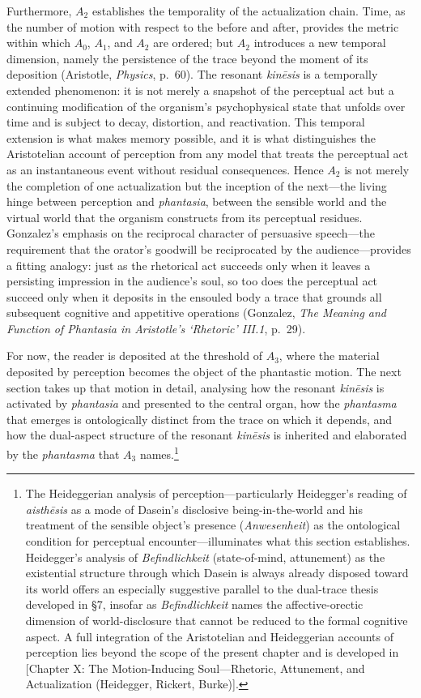 \documentclass[12pt]{article}
\begin{document}
Furthermore, $A_2$ establishes the temporality of the actualization chain. Time, as the number of motion with respect to the before and after, provides the metric within which $A_0$, $A_1$, and $A_2$ are ordered; but $A_2$ introduces a new temporal dimension, namely the persistence of the trace beyond the moment of its deposition (Aristotle, \textit{Physics}, p.~60). The resonant \textit{kinēsis} is a temporally extended phenomenon: it is not merely a snapshot of the perceptual act but a continuing modification of the organism's psychophysical state that unfolds over time and is subject to decay, distortion, and reactivation. This temporal extension is what makes memory possible, and it is what distinguishes the Aristotelian account of perception from any model that treats the perceptual act as an instantaneous event without residual consequences. Hence $A_2$ is not merely the completion of one actualization but the inception of the next---the living hinge between perception and \textit{phantasia}, between the sensible world and the virtual world that the organism constructs from its perceptual residues. Gonzalez's emphasis on the reciprocal character of persuasive speech---the requirement that the orator's goodwill be reciprocated by the audience---provides a fitting analogy: just as the rhetorical act succeeds only when it leaves a persisting impression in the audience's soul, so too does the perceptual act succeed only when it deposits in the ensouled body a trace that grounds all subsequent cognitive and appetitive operations (Gonzalez, \textit{The Meaning and Function of Phantasia in Aristotle's `Rhetoric' III.1}, p.~29).

For now, the reader is deposited at the threshold of $A_3$, where the material deposited by perception becomes the object of the phantastic motion. The next section takes up that motion in detail, analysing how the resonant \textit{kinēsis} is activated by \textit{phantasia} and presented to the central organ, how the \textit{phantasma} that emerges is ontologically distinct from the trace on which it depends, and how the dual-aspect structure of the resonant \textit{kinēsis} is inherited and elaborated by the \textit{phantasma} that $A_3$ names.\footnote{The Heideggerian analysis of perception---particularly Heidegger's reading of \textit{aisthēsis} as a mode of Dasein's disclosive being-in-the-world and his treatment of the sensible object's presence (\textit{Anwesenheit}) as the ontological condition for perceptual encounter---illuminates what this section establishes. Heidegger's analysis of \textit{Befindlichkeit} (state-of-mind, attunement) as the existential structure through which Dasein is always already disposed toward its world offers an especially suggestive parallel to the dual-trace thesis developed in §7, insofar as \textit{Befindlichkeit} names the affective-orectic dimension of world-disclosure that cannot be reduced to the formal cognitive aspect. A full integration of the Aristotelian and Heideggerian accounts of perception lies beyond the scope of the present chapter and is developed in [Chapter X: The Motion-Inducing Soul---Rhetoric, Attunement, and Actualization (Heidegger, Rickert, Burke)].}
\end{document}
